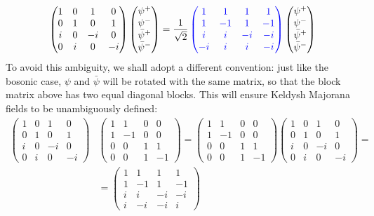\documentclass[a4paper,11pt]{article}
\theoremstyle{remark}
\newcommand{\psibar}{\bar{\psi}}
\newcommand*{\mathcolor}{}  %
\def\mathcolor#1#{\mathcoloraux{#1}}
\newcommand*{\mathcoloraux}[3]{%
  \protect\leavevmode
  \begingroup
    \color#1{#2}#3%
  \endgroup
}
\begin{document}
\begin{align*}
\begin{aligned}
\begin{pmatrix}
   1 & 0 & 1 & 0\\ 0 & 1 & 0 & 1 \\  i & 0 & -i & 0\\ 0 & i & 0 & -i 
   \end{pmatrix}
   \begin{pmatrix} 
    \psi^+ \\ \psi^- \\ \psibar^+ \\ \psibar^-
   \end{pmatrix}
    = \frac{1}{\sqrt{2}}
   \mathcolor{blue}{\begin{pmatrix}
   1 & 1 & 1 & 1\\ 1 & -1 & 1 & -1 \\ i & i & -i & -i\\ -i & i & i & -i
   \end{pmatrix}}
   \begin{pmatrix} 
   \psi^+ \\ \psi^- \\ \psibar^+ \\ \psibar^-
   \end{pmatrix}
   \end{aligned}
  \end{align*}
  To avoid this ambiguity, we shall adopt a different convention: just like the bosonic case, $\psi$ and $\psibar$ will be rotated with the same matrix, so that the block matrix above has two equal diagonal blocks. This will ensure Keldysh Majorana fields to be unambiguously defined:
  \begin{align*}
   \begin{pmatrix}
   1 & 0 & 1 & 0\\ 0 & 1 & 0 & 1 \\  i & 0 & -i & 0\\ 0 & i & 0 & -i 
   \end{pmatrix}&
   \begin{pmatrix}
   1 & 1 & 0 & 0\\ 1 & -1 & 0 & 0 \\ 0 & 0 & 1 & 1\\ 0 & 0 & 1 & -1 
   \end{pmatrix}
   =
   \begin{pmatrix}
   1 & 1 & 0 & 0\\ 1 & -1 & 0 & 0 \\ 0 & 0 & 1 & 1\\ 0 & 0 & 1 & -1 
   \end{pmatrix}
   \begin{pmatrix}
   1 & 0 & 1 & 0\\ 0 & 1 & 0 & 1 \\  i & 0 & -i & 0\\ 0 & i & 0 & -i 
   \end{pmatrix}=\\
  &= \begin{pmatrix}
   1 & 1 & 1 & 1\\ 1 & -1 & 1 & -1 \\ i & i & -i & -i\\ i & -i & -i & i
   \end{pmatrix}
  \end{align*}
\end{document}
